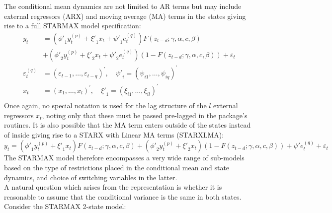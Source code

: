 The conditional mean dynamics are not limited to AR terms but may include
external regressors (ARX) and moving average (MA) terms in the states giving
rise to a full STARMAX model specification:
\begin{equation}\label{eq:starmax}
\begin{split}
{y_t}& = \left( {{{\phi '}_1}y_t^{\left( p \right)} + {{\xi '}_1}{x_t} +
{{\psi '}_1}e_t^{\left( q \right)}} \right)F\left( {{z_{t - d}};\gamma ,\alpha
,c,\beta } \right)\\
& + \left( {{{\phi '}_2}y_t^{\left( p \right)} + {{\xi '}_2}{x_t} + {{\psi
'}_2}e_t^{\left( q \right)}} \right)\left( {1 - F\left( {{z_{t - d}};\gamma
,\alpha ,c,\beta } \right)} \right) + {\varepsilon _t}\\
\varepsilon _t^{\left( q \right)} &= {\left( {{\varepsilon _{t - 1}}, \ldots
,{\varepsilon _{t - q}}} \right)^\prime },\quad {{\psi '}_i} = {\left(
{{\psi_{i1}},\dots,{\psi _{iq}}} \right)^\prime }\\
{x_t} &= {\left({{x_1},\dots,{x_l}} \right)^\prime },\quad {{\xi'}_1} =
{\left( {{\xi_{i1}},\dots,{\xi _{il}}} \right)^\prime }\\
\end{split}
\end{equation}
Once again, no special notation is used for the lag structure of the $l$
external regressors $x_t$, noting only that these must be passed pre-lagged in the
package's routines. It is also possible that the MA term enters outside of the
states instead of inside giving rise to a STARX with Linear MA terms (STARXLMA):
\begin{equation}
{y_t} = \left( {{{\phi '}_1}y_t^{\left( p \right)} + {{\xi '}_1}{x_t}}
\right)F\left( {{z_{t - d}};\gamma,\alpha,c,\beta } \right) + \left( {{{\phi
'}_2}y_t^{\left( p \right)} + {{\xi '}_2}{x_t}} \right)\left( {1 - F\left(
{{z_{t - d}};\gamma,\alpha,c,\beta } \right)} \right) + \psi 'e_t^{\left( q
\right)} + {\varepsilon _t}
\end{equation}
The STARMAX model therefore encompasses a very wide range of sub-models based on
the type of restrictions placed in the conditional mean and state dynamics, and
choice of switching variables in the latter.\\
A natural question which arises from the representation is whether it is
reasonable to assume that the conditional variance is the same in both states.
Consider the STARMAX 2-state model:
